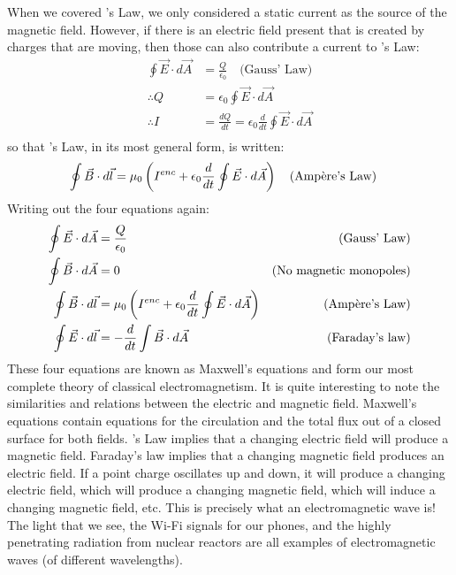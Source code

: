 When we covered \ampere's Law, we only considered a static current as the source of the magnetic field. However, if there is an electric field present that is created by charges that are moving, then those can also contribute a current to \ampere's Law:
\begin{align*}
\oint \vec E\cdot d\vec A &= \frac{Q}{\epsilon_0}\quad \text{(Gauss' Law)}\\
\therefore Q &= \epsilon_0 \oint \vec E\cdot d\vec A\\
\therefore I &= \frac{dQ}{dt} = \epsilon_0\frac{d}{dt} \oint \vec E\cdot d\vec A\\
\end{align*}
so that \ampere's Law, in its most general form, is written:
\begin{align*}
\oint \vec B\cdot d\vec l &= \mu_0 \left(I^{enc}+\epsilon_0\frac{d}{dt} \oint \vec E\cdot d\vec A\right)\quad \text{(\ampere's Law)}
\end{align*}
Writing out the four equations again:
\begin{align*}
\oint \vec E\cdot d\vec A &= \frac{Q}{\epsilon_0} &\text{(Gauss' Law)}\\
\oint \vec B\cdot d\vec A &= 0 &\text{(No magnetic monopoles)}\\
\oint \vec B\cdot d\vec l &= \mu_0 \left(I^{enc}+\epsilon_0\frac{d}{dt} \oint \vec E\cdot d\vec A\right) &\text{(\ampere's Law)}\\
\oint \vec E\cdot d\vec l &= -\frac{d}{dt}\int \vec B\cdot d\vec A  &\text{(Faraday's law)}\\
\end{align*}
These four equations are known as Maxwell's equations and form our most complete theory of classical electromagnetism. It is quite interesting to note the similarities and relations between the electric and magnetic field. Maxwell's equations contain equations for the circulation and the total flux out of a closed surface for both fields. \ampere's Law implies that a changing electric field will produce a magnetic field. Faraday's law implies that a changing magnetic field produces an electric field. If a point charge oscillates up and down, it will produce a changing electric field, which will produce a changing magnetic field, which will induce a changing magnetic field, etc. This is precisely what an electromagnetic wave is! The light that we see, the Wi-Fi signals for our phones, and the highly penetrating radiation from nuclear reactors are all examples of electromagnetic waves (of different wavelengths). 


